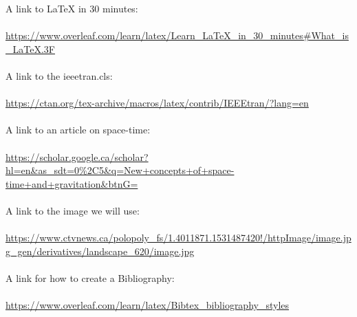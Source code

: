 \documentclass{article} %
\begin{document}
A link to LaTeX in 30 minutes:\\\\
\url{https://www.overleaf.com/learn/latex/Learn_LaTeX_in_30_minutes#What_is_LaTeX.3F}\\\\

A link to the ieeetran.cls:\\\\
\url{https://ctan.org/tex-archive/macros/latex/contrib/IEEEtran/?lang=en}\\\\

A link to an article on space-time:\\\\
\url{https://scholar.google.ca/scholar?hl=en&as_sdt=0%2C5&q=New+concepts+of+space-time+and+gravitation&btnG=}\\\\

A link to the image we will use:\\\\
\url{https://www.ctvnews.ca/polopoly_fs/1.4011871.1531487420!/httpImage/image.jpg_gen/derivatives/landscape_620/image.jpg}\\\\

A link for how to create a Bibliography:\\\\
\url{https://www.overleaf.com/learn/latex/Bibtex_bibliography_styles}\\\\
\end{document}
